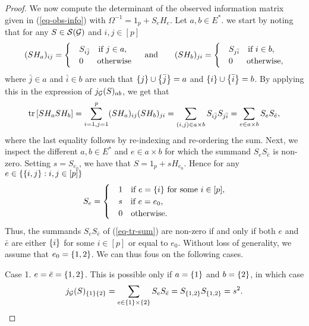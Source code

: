 \begin{proof}
    We now compute the determinant of the observed information matrix given in (\ref{eq-obs-info}) with $\Omega^{-1} = 1_p + S_e H_e$. Let $a, b \in E^*$. we start by noting that for any $S \in {\mathcal{S}}({\mathcal{G}})$ and $i, j \in [p]$
    \begin{equation*}
        (SH_a)_{ij} = \begin{cases}
            & S_{i \bar j}\ \ \t{ if } j \in a,\\
            &0\ \ \ \ \  \t{otherwise}
        \end{cases}
        \ \ \ \t{ and }\ \ \ \ \ 
        (SH_b)_{ji} = \begin{cases}
            & S_{j \bar i}\ \ \t{ if } i \in b,\\
            &0\ \ \ \ \  \t{otherwise},
        \end{cases}
    \end{equation*}
    where $\bar j \in a$ and $\bar i \in b$ are such that ${\left\{j\right\}} \cup {\left\{\bar j\right\}} = a$ and ${\left\{i\right\}} \cup {\left\{\bar i\right\}} = b$. By applying this in the expression of $j_{\mathcal{G}}(S)_{ab}$, we get that
    \begin{equation} \label{eq-tr-sum}
        {\textrm{tr}\left[SH_aSH_b\right]} = \sum_{i=1, j=1}^p (SH_a)_{ij}(SH_b)_{ji} = \sum_{(i, j) \in a \times b} S_{i \bar j} S_{j \bar i} = \sum_{e \in a \times b} S_e S_{\bar e},
    \end{equation}
    where the last equality follows by re-indexing and re-ordering the sum. Next, we inspect the different $a, b \in E^*$ and $e \in a \times b$ for which the summand $S_eS_{\bar e}$ is non-zero. Setting $s = S_{e_0}$, we have that $S = 1_p + s H_{e_0}$. Hence for any $e \in {\left\{ {\left\{i, j\right\}} : i,j \in [p] \right\}}$
    \begin{equation*}
        S_e = \begin{cases}
            &1\ \ {\textrm{ if }} e = {\left\{ i \right\}} {\textrm{ for some }} i \in [p],\\
            &s\ \ {\textrm{ if }} e = e_0,\\
            &0\ \ {\textrm{ otherwise}}.
        \end{cases}
    \end{equation*}
    Thus, the summands $S_e S_{\bar e}$ of (\ref{eq-tr-sum}) are non-zero if and only if both $e$ and $\bar e$ are either ${\left\{i\right\}}$ for some $i \in [p]$ or equal to $e_0$. Without loss of generality, we assume that $e_0 = {\left\{1, 2\right\}}$. We can thus fous on the following cases. 

    Case 1. $e = \bar e = {\left\{1, 2\right\}}$. This is possible only if $a = {\left\{1\right\}}$ and $b = {\left\{2\right\}}$, in which case
    \begin{equation*}
        j_{\mathcal{G}}(S)_{{\left\{1\right\}} {\left\{2\right\}}} = \sum_{e \in {\left\{1\right\}} \times {\left\{2\right\}}} S_e S_{\bar e} = S_{{\left\{1, 2\right\}}}S_{{\left\{1, 2\right\}}} = s^2.
    \end{equation*}


\end{proof}
